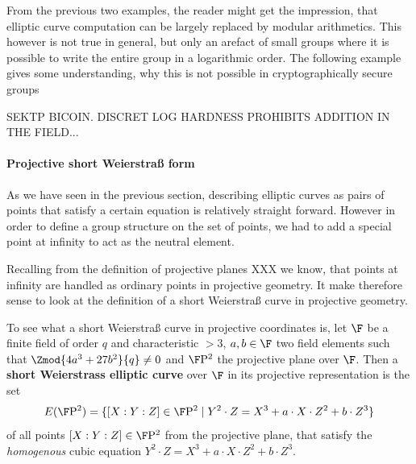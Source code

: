 From the previous two examples, the reader might get the impression, that elliptic curve computation can be largely replaced by modular arithmetics. This however is not true in general, but only an arefact of small groups where it is possible to write the entire group in a logarithmic order. The following example gives some understanding, why this is not possible in cryptographically secure groups
\begin{example}
SEKTP BICOIN. DISCRET LOG HARDNESS PROHIBITS ADDITION IN THE FIELD...
\end{example}
\paragraph{Projective short Weierstraß form}
As we have seen in the previous section, describing elliptic curves as pairs of points that satisfy a certain equation is relatively straight forward. However in order to define a group structure on the set of points, we had to add a special point at infinity to act as the neutral element. 

Recalling from the definition of projective planes XXX we know, that points at infinity are handled as ordinary points in projective geometry. It make therefore sense to look at the definition of a short Weierstraß curve in projective geometry.

To see what a short Weierstraß curve in projective coordinates is, let $\F$ be a finite field of order $q$ and characteristic $>3$, $a,b\in \F$ two field elements such that $\Zmod{4a^3+ 27b^2}{q}\neq 0$ and $\F\mathrm{P}^2$ the projective plane over $\F$. Then a \textbf{short Weierstrass elliptic curve} over $\F$ in its projective representation is the set
\begin{equation}
\label{def_short_weierstrass_curve}
E(\F\mathrm{P}^2) = \{[X:Y:Z]\in \F\mathrm{P}^2\;|\; Y^2\cdot Z = X^3+a\cdot X\cdot Z^2 + b\cdot Z^3 \}
\end{equation}
of all points $[X:Y:Z]\in \F\mathrm{P}^2$ from the projective plane, that satisfy the \textit{homogenous} cubic equation $Y^2\cdot Z = X^3+a\cdot X\cdot Z^2 + b\cdot Z^3$.

